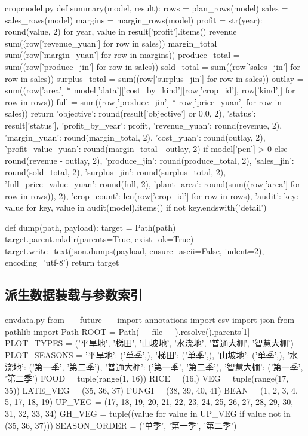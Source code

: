 \documentclass[bwprint]{gmcmthesis}
\begin{document}
\begin{appendices}
\begin{Python}{cropmodel.py}
def summary(model, result):
    rows = plan_rows(model)
    sales = sales_rows(model)
    margins = margin_rows(model)
    profit = {str(year): round(value, 2) for year, value in result['profit'].items()}
    revenue = sum((row['revenue_yuan'] for row in sales))
    margin_total = sum((row['margin_yuan'] for row in margins))
    produce_total = sum((row['produce_jin'] for row in sales))
    sold_total = sum((row['sales_jin'] for row in sales))
    surplus_total = sum((row['surplus_jin'] for row in sales))
    outlay = sum((row['area'] * model['data']['cost_by_kind'][row['crop_id'], row['kind']] for row in rows))
    full = sum((row['produce_jin'] * row['price_yuan'] for row in sales))
    return {'objective': round(result['objective'] or 0.0, 2), 'status': result['status'], 'profit_by_year': profit, 'revenue_yuan': round(revenue, 2), 'margin_yuan': round(margin_total, 2), 'cost_yuan': round(outlay, 2), 'profit_value_yuan': round(margin_total - outlay, 2) if model['pen'] > 0 else round(revenue - outlay, 2), 'produce_jin': round(produce_total, 2), 'sales_jin': round(sold_total, 2), 'surplus_jin': round(surplus_total, 2), 'full_price_value_yuan': round(full, 2), 'plant_area': round(sum((row['area'] for row in rows)), 2), 'crop_count': len({row['crop_id'] for row in rows}), 'audit': {key: value for key, value in audit(model).items() if not key.endswith('detail')}}

def dump(path, payload):
    target = Path(path)
    target.parent.mkdir(parents=True, exist_ok=True)
    target.write_text(json.dumps(payload, ensure_ascii=False, indent=2), encoding='utf-8')
    return target
\end{Python}

\subsection{派生数据装载与参数索引}


\begin{Python}{envdata.py}
from __future__ import annotations
import csv
import json
from pathlib import Path
ROOT = Path(__file__).resolve().parents[1]
PLOT_TYPES = ('平旱地', '梯田', '山坡地', '水浇地', '普通大棚', '智慧大棚')
PLOT_SEASONS = {'平旱地': ('单季',), '梯田': ('单季',), '山坡地': ('单季',), '水浇地': ('第一季', '第二季'), '普通大棚': ('第一季', '第二季'), '智慧大棚': ('第一季', '第二季')}
FOOD = tuple(range(1, 16))
RICE = (16,)
VEG = tuple(range(17, 35))
LATE_VEG = (35, 36, 37)
FUNGI = (38, 39, 40, 41)
BEAN = (1, 2, 3, 4, 5, 17, 18, 19)
UP_VEG = (17, 18, 19, 20, 21, 22, 23, 24, 25, 26, 27, 28, 29, 30, 31, 32, 33, 34)
GH_VEG = tuple((value for value in UP_VEG if value not in (35, 36, 37)))
SEASON_ORDER = ('单季', '第一季', '第二季')


\end{Python}
\end{appendices}
\end{document}
